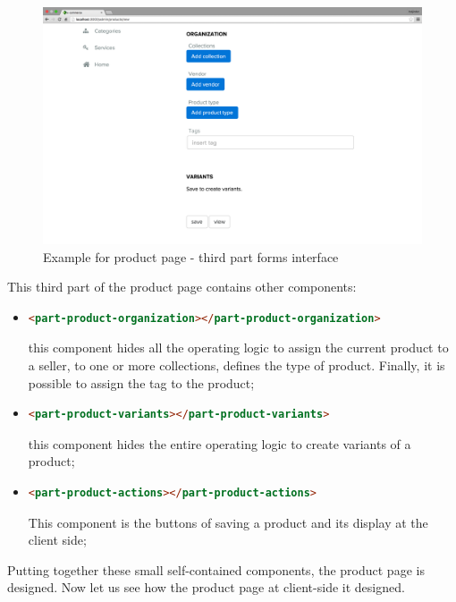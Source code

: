 \begin{figure}[htb]
\centering
\includegraphics[width=1.0\linewidth]{images/chapter4/product-page-ex3.png}\hfill
\caption[Product page third part form]{Example for product page - third part forms interface}
\label{fig:design_page}
\end{figure}
\newline
This third part of the product page contains other components:
\begin{itemize}
\item
\begin{lstlisting}[language=html]
<part-product-organization></part-product-organization>
\end{lstlisting}
this component hides all the operating logic to assign the current product to a seller, to one or more collections, defines the type of product. Finally, it is possible to assign the tag to the product;
\item
\begin{lstlisting}[language=html]
<part-product-variants></part-product-variants>
\end{lstlisting}
this component hides the entire operating logic to create variants of a product;
\item
\begin{lstlisting}[language=html]
<part-product-actions></part-product-actions>
\end{lstlisting}
This component is the buttons of saving a product and its display at the client side;
\end{itemize}
Putting together these small self-contained components, the product page is designed. Now let us see how the product page at client-side it designed.
